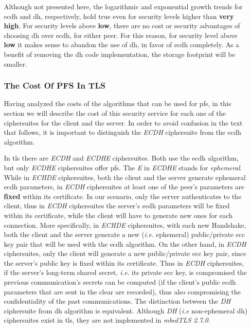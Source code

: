 Although not presented here, the logarithmic and exponential growth trends for \gls{ecdh} and \gls{dh}, respectively, hold true even for
security levels higher than \textbf{very high}. For security levels above \textbf{low}, there are no cost or security
advantages of choosing \gls{dh} over \gls{ecdh}, for either peer. For this reason, for security level above \textbf{low} it makes sense to abandon the
use of \gls{dh}, in favor of \gls{ecdh} completely. As a benefit of removing the \gls{dh} code implementation, the storage footprint will be smaller.


\subsubsection{The Cost Of PFS In TLS} \label{sec:pfs-cost-in-tls}

Having analyzed the costs of the algorithms that can be used for \gls{pfs}, in this section we will describe the cost of this security service
for each one of the ciphersuites for the client and the server. In order to avoid confusion in the text that follows, it is important to
distinguish the \textit{ECDH} ciphersuite from the \gls{ecdh} algorithm.

In \gls{tls} there are \textit{ECDH} and \textit{ECDHE} ciphersuites. Both use the \gls{ecdh} algorithm, but only \textit{ECDHE} ciphersuites
offer \gls{pfs}. The \textit{E} in \textit{ECDHE} stands for \textit{ephemeral}. While in \textit{ECHDE} ciphersuites, both the client and the server
generate ephemeral \gls{ecdh} parameters, in \textit{ECDH} ciphersuites at least one of the peer's parameters are \textbf{fixed}
within its certificate. In our scenario, only the server authenticates to the client, thus in \textit{ECDH} ciphersuites the server's
\gls{ecdh} parameters will be fixed within its certificate, while the client will have to generate new ones for each connection.
More specifically, in \textit{ECHDE} ciphersuites, with each  new Handshake, both the client and the server generate a new (\textit{i.e.} ephemeral)
public/private \gls{ecc} key pair that will be used with the \gls{ecdh} algorithm. On the other hand, in \textit{ECDH} ciphersuites, only the client
will generate a new public/private \gls{ecc} key pair, since the server's public key is fixed within its certificate. Thus in \textit{ECDH}
ciphersuites, if the server's long-term shared secret, \textit{i.e.} its private \gls{ecc} key, is compromised the previous communication's secrets
can be computed (if the client's public \gls{ecdh} parameters that are sent in the clear are recorded), thus also compromising the confidentiality of
the past communications. The distinction between the \textit{DH} ciphersuite from \gls{dh} algorithm is equivalent. Although \textit{DH} (\textit{i.e}
non-ephemeral \gls{dh}) ciphersuites exist in \gls{tls}, they are not implemented in \textit{mbedTLS 2.7.0}.

